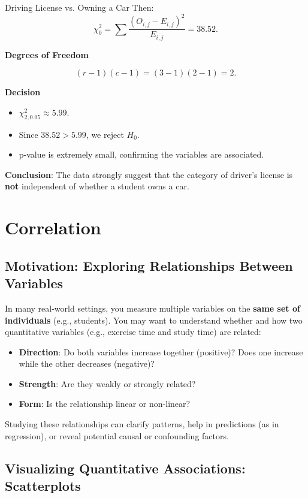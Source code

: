 \documentclass[10pt]{extarticle}
\begin{document}
\begin{examplebox}{Driving License vs. Owning a Car}{}
    Then:
    \[
        \chi^2_0
        = \sum \frac{(O_{i,j} - E_{i,j})^2}{E_{i,j}}
        = 38.52.
    \]

    \textbf{Degrees of Freedom}

    \[
        (r - 1)(c - 1) = (3 - 1)(2 - 1) = 2.
    \]

    \textbf{Decision}

    \begin{itemize}
        \item $\chi^2_{2,0.05}\approx 5.99$.
        \item Since $38.52 > 5.99$, we reject $H_0$.
        \item p-value is extremely small, confirming the variables are associated.
    \end{itemize}

    \textbf{Conclusion}: The data strongly suggest that the category of driver's license is \textbf{not} independent of whether a student owns a car.
\end{examplebox}

\pagebreak
\section{Correlation}
\subsection{Motivation: Exploring Relationships Between Variables}

In many real-world settings, you measure multiple variables on the \textbf{same set of individuals} (e.g., students). You may want to understand whether and how two quantitative variables (e.g., exercise time and study time) are related:
\begin{itemize}
    \item \textbf{Direction}: Do both variables increase together (positive)? Does one increase while the other decreases (negative)?
    \item \textbf{Strength}: Are they weakly or strongly related?
    \item \textbf{Form}: Is the relationship linear or non-linear?
\end{itemize}

Studying these relationships can clarify patterns, help in predictions (as in regression), or reveal potential causal or confounding factors.



\subsection{Visualizing Quantitative Associations: Scatterplots}
\end{document}

